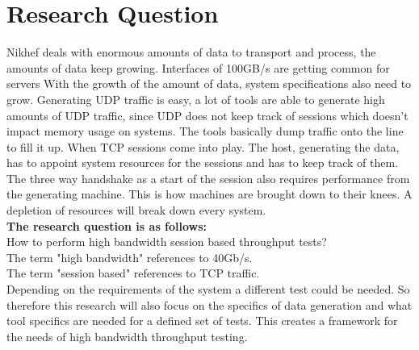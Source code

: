 \section{Research Question}

Nikhef deals with enormous amounts of data to transport and process, the amounts of data keep growing.  
Interfaces of 100GB/s are getting common for servers
With the growth of the amount of data, system specifications also need to grow.
Generating UDP traffic is easy, a lot of tools are able to generate high amounts of UDP traffic, since UDP does not keep track of sessions which doesn't impact memory usage on systems. The tools basically dump traffic onto the line to fill it up. When TCP sessions come into play.
The host, generating the data, has to appoint system resources for the sessions and has to keep track of them. The three way handshake as a start of the session also requires performance from the generating machine. This is how machines are brought down to their knees. A depletion of resources will break down every system. \\
  
\textbf{The research question is as follows:}\\
How to perform high bandwidth session based throughput tests? \\

The term "high bandwidth" references to 40Gb/s. \\
The term "session based" references to TCP traffic. \\

Depending on the requirements of the system a different test could be needed. 
So therefore this research will also focus on the specifics of data generation and what tool specifics are needed for a defined set of tests. This creates a framework for the needs of high bandwidth throughput testing.  

